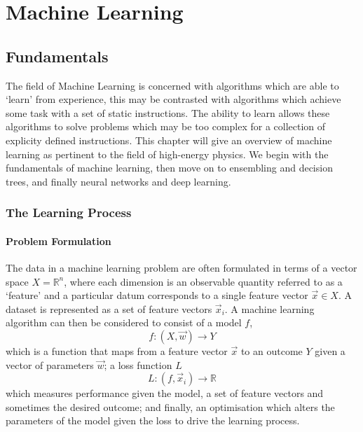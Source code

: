 \chapter{Machine Learning}
\label{chap:machine_learning}


\newpage

\section{Fundamentals}
The field of Machine Learning is concerned with algorithms which are able to `learn' from experience, this may be contrasted with algorithms which achieve some task with a set of static instructions. The ability to learn allows these algorithms to solve problems which may be too complex for a collection of explicity defined instructions. 
This chapter will give an overview of machine learning as pertinent to the field of high-energy physics. We begin with the fundamentals of machine learning, then move on to ensembling and decision trees, and finally neural networks and deep learning.  


\subsection{The Learning Process}

\subsubsection{Problem Formulation}
The data in a machine learning problem are often formulated in terms of a vector space $X = \mathds{R}^{n}$, where each dimension is an observable quantity referred to as a `feature' and a particular datum corresponds to a single feature vector $\vec{x} \in X$. A dataset is represented as a set of feature vectors $\vec{x}_{i}$.
A machine learning algorithm can then be considered to consist of a model $f$, 
\begin{equation}
    f:(X,\vec{w})\rightarrow{Y}
\end{equation}
which is a function that maps from a feature vector $\vec{x}$ to an outcome $Y$ given a vector of parameters $\vec{w}$; a loss function $L$
\begin{equation}
    L:(f,\vec{x}_{i})\rightarrow{\mathds{R}}
\end{equation}
which measures performance given the model, a set of feature vectors and sometimes the desired outcome; 
and finally, an optimisation which alters the parameters of the model given the loss to drive the learning process.


